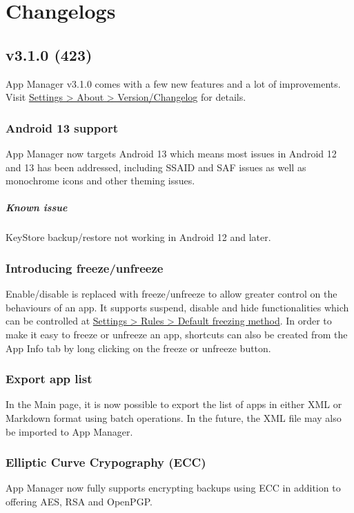\chapter{Changelogs}\label{ch:changelogs} %

\section{v3.1.0 (423)}\label{sec:v3.1.0-(423)}

App Manager v3.1.0 comes with a few new features and a lot of improvements.
Visit \href{app-manager://settings/about/version}{Settings > About > Version/Changelog} for details.

\subsection{Android 13 support}
App Manager now targets Android 13 which means most issues in Android 12 and 13 has been addressed, including SSAID and SAF issues as well as monochrome icons and other theming issues.

\paragraph{Known issue} KeyStore backup/restore not working in Android 12 and later.

\subsection{Introducing freeze/unfreeze}
Enable/disable is replaced with freeze/unfreeze to allow greater control on the behaviours of an app.
It supports suspend, disable and hide functionalities which can be controlled at
\href{app-manager://settings/rules_prefs/freeze_type}{Settings > Rules > Default freezing method}.
In order to make it easy to freeze or unfreeze an app, shortcuts can also be created from the App Info tab by long clicking on the freeze or unfreeze button.

\subsection{Export app list}
In the Main page, it is now possible to export the list of apps in either XML or Markdown format using batch operations.
In the future, the XML file may also be imported to App Manager.

\subsection{Elliptic Curve Crypography (ECC)}
App Manager now fully supports encrypting backups using ECC in addition to offering AES, RSA and OpenPGP\@.

